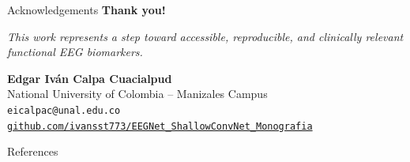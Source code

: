 \documentclass{beamer}
\begin{document}
\begin{frame}{Acknowledgements}
\centering
\vspace{1cm}
{\Huge \textbf{Thank you!}}

\vspace{1cm}
{\large \textit{This work represents a step toward accessible, reproducible, and clinically relevant functional EEG biomarkers.}}

\vspace{0.5cm}
\textbf{Edgar Iván Calpa Cuacialpud} \\
National University of Colombia – Manizales Campus \\
\texttt{eicalpac@unal.edu.co} \\
\texttt{\href{https://github.com/ivansst773/EEGNet_ShallowConvNet_Monografia}{github.com/ivansst773/EEGNet\_ShallowConvNet\_Monografia}}
\end{frame}


\begin{frame}[allowframebreaks]{References}
  \printbibliography
\end{frame}
\end{document}
